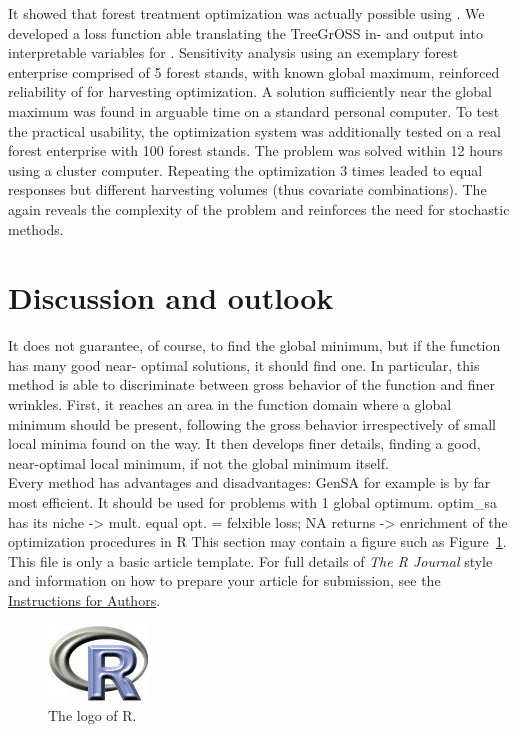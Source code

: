 It showed that forest treatment optimization was actually possible using . We developed a loss function able translating the TreeGrOSS in- and output into interpretable variables for . Sensitivity analysis using an exemplary forest enterprise comprised of 5 forest stands, with known global maximum, reinforced reliability of  for harvesting optimization. A solution sufficiently near the global maximum was found in arguable time on a standard personal computer. To test the practical usability, the optimization system was additionally tested on a real forest enterprise with 100 forest stands. The problem was solved within 12 hours using a cluster computer. Repeating the optimization 3 times leaded to equal responses but different harvesting volumes (thus covariate combinations). The again reveals the complexity of the problem and reinforces the need for stochastic methods.

\section{Discussion and outlook}
It does not guarantee, of course, to find the global minimum, but if the function has many good near- optimal solutions, it should find one. In particular, this method is able to discriminate between gross behavior of the function and finer wrinkles. First, it reaches an area in the function domain where a global minimum should be present, following the gross behavior irrespectively of small local minima found on the way. It then develops finer details, finding a good, near-optimal local minimum, if not the global minimum itself.\\

Every method has advantages and disadvantages: GenSA for example is by far most efficient. It should be used for problems with 1 global optimum. optim\_sa has its niche -> mult. equal opt. = felxible loss; NA returns
-> enrichment of the optimization procedures in R  
This section may contain a figure such as Figure~\ref{figure:rlogo}.
This file is only a basic article template. For full details of \emph{The R Journal} style and information on how to prepare your article for submission, see the \href{http://journal.r-project.org/share/author-guide.pdf}{Instructions for Authors}.

\begin{figure}[htbp]
	\centering
	\includegraphics{Fig/Rlogo}
	\caption{The logo of R.}
	\label{figure:rlogo}
\end{figure}

